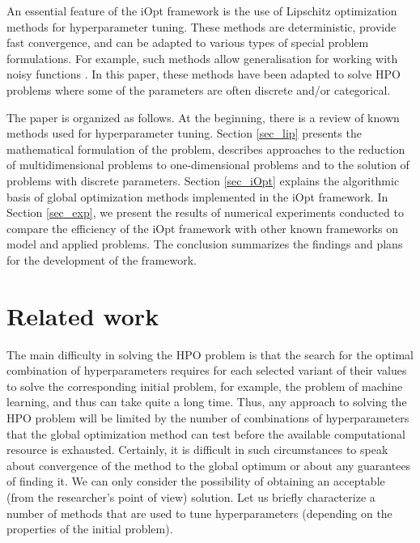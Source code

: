 \documentclass[iicol]{sn-jnl}
\theoremstyle{thmstyleone}%
\theoremstyle{thmstyletwo}%
\theoremstyle{thmstylethree}%
\begin{document}
An essential feature of the iOpt framework is the use of Lipschitz optimization methods for hyperparameter tuning. These methods are deterministic, provide fast convergence, and can be adapted to various types of special problem formulations. For example, such methods allow generalisation for working with noisy functions  \citep{Sergeyev2020}. In this paper, these methods have been adapted to solve HPO problems where some of the parameters are often discrete and/or categorical.

The paper is organized as follows. At the beginning, there is a review of known methods used for hyperparameter tuning. Section \ref{sec_lip} presents the mathematical formulation of the problem, describes approaches to the reduction of multidimensional problems to one-dimensional problems and to the solution of problems with discrete parameters. Section \ref{sec_iOpt} explains the algorithmic basis of global optimization methods implemented in the iOpt framework. In Section \ref{sec_exp}, we present the results of numerical experiments conducted to compare the efficiency of the iOpt framework with other known frameworks on model and applied problems. The conclusion summarizes the findings and plans   for the development of the framework.

\section{Related work}\label{sec_rel}

The main difficulty in solving the HPO problem is that the search for the optimal combination of hyperparameters requires for each selected variant of their values to solve the corresponding initial problem, for example, the problem of machine learning, and thus can take quite a long time. Thus, any approach to solving the HPO problem will be limited by the number of combinations of hyperparameters that the global optimization method can test before the available computational resource is exhausted.  Certainly, it is difficult in such circumstances to speak about convergence of the method to the global optimum or about any guarantees of finding it. We can only consider the possibility of obtaining an acceptable (from the researcher's point of view) solution. Let us briefly characterize a number of methods that are used to tune hyperparameters (depending on the properties of the initial problem). 
\end{document}
